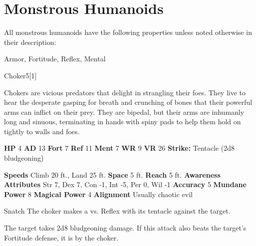         \section{Monstrous Humanoids}

        All monstrous humanoids have the following properties unless noted otherwise in their description:
        
    
     Armor,
     Fortitude,
     Reflex,
     Mental
  
  
      
  \begin{monsection}{Choker}{5}[1]
    \vspace{-1em}\vspace{-1em}
    \vspace{0em}

    
      Chokers are vicious predators that delight in strangling their foes.
      They live to hear the desperate gasping for breath and crunching of bones that their powerful arms can inflict on their prey.
      They are bipedal, but their arms are inhumanly long and sinuous, terminating in hands with spiny pads to help them hold on tightly to walls and foes.
    
    

    \begin{spellcontent}
      \begin{spelltargetinginfo}
        \pari \textbf{HP} 4 \monsep
          \textbf{AD} 13 \monsep
          \textbf{Fort} 7 \monsep
          \textbf{Ref} 11 \monsep
          \textbf{Ment} 7
        \pari \textbf{WR} 9 \monsep
        \textbf{VR} 26
        \pari \textbf{Strike:}
            Tentacle  (2d8 bludgeoning)
      \end{spelltargetinginfo}
    \end{spellcontent}
    \begin{monsterfooter}
      \pari \textbf{Speeds} Climb 20 ft., Land 25 ft. \monsep
        \textbf{Space} 5 ft. \monsep
        \textbf{Reach} 5 ft.
      \pari \textbf{Awareness} 
      \pari \textbf{Attributes}
        Str 7, Dex 7,
        Con -1, Int -5,
        Per 0, Wil -1
      \pari \textbf{Accuracy} 5 \monsep
        \textbf{Mundane Power} 8 \monsep
      \textbf{Magical Power} 4
      \pari \textbf{Alignment} Usually chaotic evil
    \end{monsterfooter}
  \end{monsection}
  \begin{freeability}{Snatch}
       The choker makes a 
         vs. Reflex
        with its tentacle against the target.
    
    \hit 
          The target takes 2d8 bludgeoning damage.
          If this attack also beats the target's Fortitude defense, it is  by the choker.
    \end{freeability}
  


